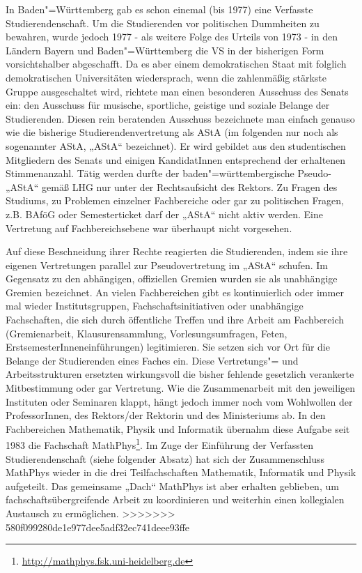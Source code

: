 In Baden"=Württemberg gab es schon einemal (bis 1977) eine Verfasste
Studierendenschaft. Um die Studierenden vor politischen Dummheiten zu
bewahren, wurde jedoch 1977 - als weitere Folge des Urteils von 1973 - in
den Ländern Bayern und Baden"=Württemberg die VS in der bisherigen Form
vorsichtshalber abgeschafft. Da es aber einem demokratischen Staat mit
folglich demokratischen Universitäten wiedersprach, wenn die
zahlenmäßig stärkste Gruppe ausgeschaltet wird, richtete man einen
besonderen Ausschuss des Senats ein: den Ausschuss für musische,
sportliche, geistige und soziale Belange der Studierenden. Diesen rein
beratenden Ausschuss bezeichnete man einfach genauso wie die bisherige
Studierendenvertretung als AStA (im folgenden nur noch als sogenannter
AStA, „AStA“ bezeichnet). Er wird gebildet aus den studentischen
Mitgliedern des Senats und einigen KandidatInnen entsprechend der
erhaltenen Stimmenanzahl. Tätig werden durfte der baden"=württembergische
Pseudo-„AStA“ gemäß LHG nur unter der Rechtsaufsicht des Rektors. Zu
Fragen des Studiums, zu Problemen einzelner Fachbereiche oder gar zu
politischen Fragen, z.B. BAföG oder Semesterticket darf der „AStA“ nicht
aktiv werden. Eine Vertretung auf Fachbereichsebene war überhaupt nicht
vorgesehen.

Auf diese Beschneidung ihrer Rechte reagierten die
Studierenden, indem sie ihre eigenen Vertretungen parallel zur
Pseudovertretung im „AStA“ schufen. Im Gegensatz zu den abhängigen,
offiziellen Gremien wurden sie als unabhängige Gremien bezeichnet.
An vielen Fachbereichen gibt es kontinuierlich oder immer mal wieder
Institutsgruppen, Fachschaftsinitiativen oder unabhängige Fachschaften,
die sich durch öffentliche Treffen und ihre Arbeit am Fachbereich
(Gremienarbeit, Klausurensammlung, Vorlesungsumfragen, Feten,
ErstsemesterInneneinführungen) legitimieren. Sie setzen sich vor Ort für
die Belange der Studierenden eines Faches ein. Diese Vertretungs"= und
Arbeitsstrukturen ersetzten wirkungsvoll die bisher fehlende gesetzlich verankerte
Mitbestimmung oder gar Vertretung. Wie die Zusammenarbeit mit den
jeweiligen Instituten oder Seminaren klappt, hängt jedoch immer noch vom
Wohlwollen der ProfessorInnen, des Rektors/der Rektorin und des Ministeriums ab. In den
Fachbereichen Mathematik, Physik und Informatik übernahm diese Aufgabe
seit 1983 die Fachschaft MathPhys\footnote{\url{http://mathphys.fsk.uni-heidelberg.de}}.
Im Zuge der Einführung der Verfassten Studierendenschaft (siehe folgender Absatz) hat sich der Zusammenschluss MathPhys
wieder in die drei Teilfachschaften Mathematik, Informatik und Physik aufgeteilt.
Das gemeinsame „Dach“ MathPhys ist aber erhalten geblieben, um fachschaftsübergreifende
Arbeit zu koordinieren und weiterhin einen kollegialen Austausch zu ermöglichen.
>>>>>>> 580f099280de1e977dee5adf32ec741deee93ffe


